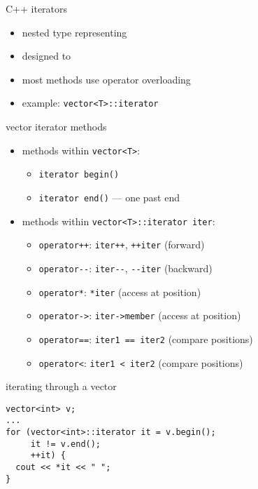 \begin{frame}{C++ iterators}
    \begin{itemize}
        \item nested type representing 
        \item designed to 
        \item most methods use operator overloading
        \item example: \texttt{vector<T>::iterator}
    \end{itemize}
\end{frame}

\begin{frame}[fragile,label=itMethods]{vector iterator methods}
\lstset{
    language=C++,
    style=smaller,
}
\begin{itemize}
\item methods within \lstinline|vector<T>|:
    \begin{itemize}
    \item \lstinline|iterator begin()|
    \item \lstinline|iterator end()| --- one past end
    \end{itemize}
\item methods within \lstinline|vector<T>::iterator iter|:
    \begin{itemize}
        \item \lstinline|operator++|: \lstinline|iter++|, \lstinline|++iter| (forward)
        \item \lstinline|operator--|: \lstinline|iter--|, \lstinline|--iter| (backward)
            \item \lstinline|operator*|: \lstinline|*iter| (access at position)
            \item \lstinline|operator->|: \lstinline|iter->member| (access at position)
            \item \lstinline|operator==|: \lstinline|iter1 == iter2| (compare positions)
            \item \lstinline|operator<|: \lstinline|iter1 < iter2| (compare positions)
    \end{itemize}
\end{itemize}
\end{frame}

\begin{frame}[fragile,label=itInVector]{iterating through a vector}
\lstset{
    language=C++,
    style=small
}
\begin{lstlisting}
vector<int> v;
...
for (vector<int>::iterator it = v.begin();
     it != v.end();
     ++it) {
  cout << *it << " ";
}
\end{lstlisting}
\end{frame}

